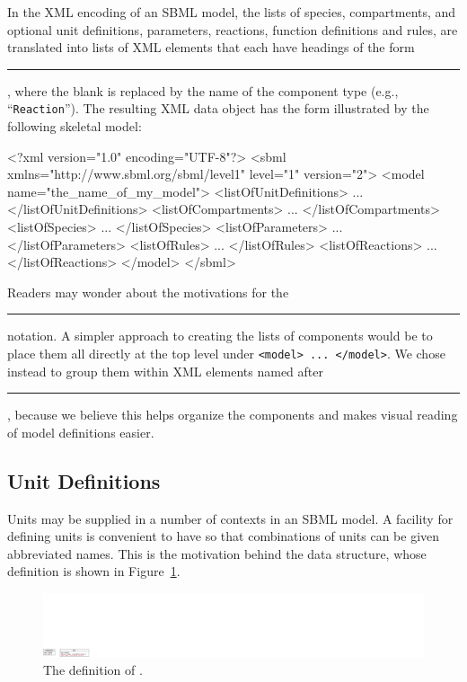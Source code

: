 \documentclass[10pt]{cekarticle}
\newcommand{\vref}[1]{\ref{#1}}
\newcommand{\changed}[1]{\textcolor{BrickRed}{#1}}
\begin{document}
In the XML encoding of an SBML model, the lists of species, compartments,
and optional unit definitions, parameters, reactions, function definitions
and rules, are translated into lists of XML elements that each have
headings of the form \rule{0.5in}{0.5pt}, where the
blank is replaced by the name of the component type (e.g.,
``\texttt{Reaction}'').  The resulting XML data object has the form
illustrated by the following skeletal model:

\begin{example}
<?xml version="1.0" encoding="UTF-8"?>
<sbml xmlns="http://www.sbml.org/sbml/level1" level="1" version="\changed{2}">
  <model name="the_name_of_my_model">
    <listOfUnitDefinitions>
        ...
    </listOfUnitDefinitions>
    <listOfCompartments>
        ...
    </listOfCompartments>
    <listOfSpecies>
        ...
    </listOfSpecies>
    <listOfParameters>
        ...
    </listOfParameters>
    <listOfRules>
        ...
    </listOfRules>
    <listOfReactions>
        ...
    </listOfReactions>
  </model>
</sbml>
\end{example}

Readers may wonder about the motivations for the
\rule{0.5in}{0.5pt} notation.  A simpler approach to
creating the lists of components would be to place them all directly
at the top level under \texttt{<model> ... </model>}.  We chose instead to
group them within XML elements named after
\rule{0.5in}{0.5pt}, because we believe this helps
organize the components and makes visual reading of model definitions
easier.


\subsection{Unit Definitions}
\label{sec:unitdefinitions}

Units may be supplied in a number of contexts in an SBML model.  A facility
for defining units is convenient to have so that combinations of units can
be given abbreviated names.  This is the motivation behind the
 data structure, whose definition is shown in
Figure~\vref{fig:unitdefinition}.

\begin{figure}[htb]
  \centering
  \includegraphics[scale = 0.68]{unitdefinition}
  \caption{The definition of .}
  \label{fig:unitdefinition}
\end{figure}
\end{document}
